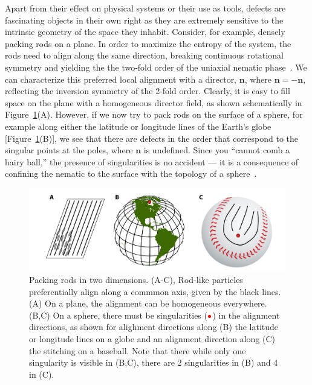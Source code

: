Apart from their effect on physical systems or their use as tools, defects are fascinating objects in their own right as they are extremely sensitive to the intrinsic geometry of the space they inhabit.
Consider, for example, densely packing rods on a plane.
In order to maximize the entropy of the system, the rods need to align along the same direction, breaking continuous rotational symmetry and yielding the the two-fold order of the uniaxial nematic phase~\cite{RN204}.
We can characterize this preferred local alignment with a director, $\mathbf{n}$, where $\mathbf{n} = \mathbf{-n}$, reflecting the inversion symmetry of the 2-fold order.
Clearly, it is easy to fill space on the plane with a homogeneous director field, as shown schematically in Figure~\ref{f:1-RodsPlane}(A).
However, if we now try to pack rods on the surface of a sphere, for example along either the latitude or longitude lines of the Earth's globe [Figure~\ref{f:1-RodsPlane}(B)], we see that there are defects in the order that correspond to the singular points at the poles, where $\mathbf{n}$ is undefined.
Since you ``cannot comb a hairy ball,'' the presence of singularities is no accident --- it is a consequence of confining the nematic to the surface with the topology of a sphere~\cite{RN209,RN169}.
\begin{figure}
  \centering
  \includegraphics{figures/C1/Ch1-Figs_RodsPlane.png}
  \caption{Packing rods in two dimensions.
  (A-C), Rod-like particles preferentially align along a commmon axis, given by the black lines.
  (A) On a plane, the alignment can be homogeneous everywhere.
  (B,C) On a sphere, there must be singularities (${\color{red} \bullet}$) in the alignment directions, as shown for alighment directions along (B) the latitude or longitude lines on a globe and an alignment direction along (C) the stitching on a baseball.
  Note that there while only one singularity is visible in (B,C), there are 2 singularities in (B) and 4 in (C).}\label{f:1-RodsPlane}
\end{figure}


